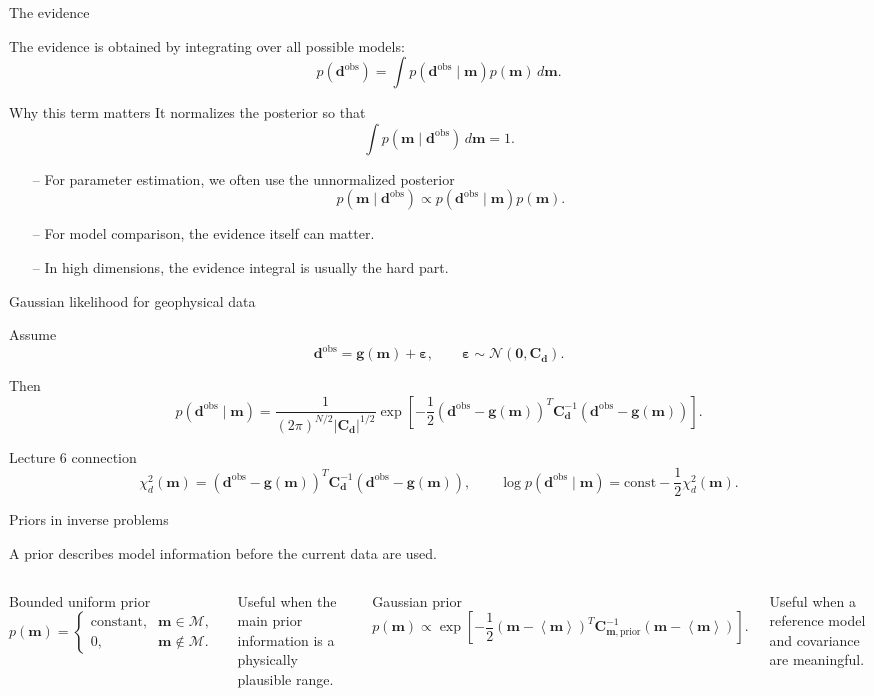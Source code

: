 \documentclass[aspectratio=169]{beamer}
\newcommand{\mat}[1]{{\mathbf{#1}}}
\renewcommand{\vec}[1]{\mathbf{#1}}
\newcommand{\dd}{ {\vec{d}} }
\newcommand{\dobs}{{\vec{d}^{\text{obs}}}}
\newcommand{\mm}{ {\vec{m}} }
\newcommand{\mmean}{\left\langle \mm \right\rangle}
\renewcommand{\gg}[1]{\vec{g}\left(#1\right)}
\newcommand{\Cd}{\mat{C}_{\dd}}
\newcommand{\Cm}{\mat{C}_{\mm,\text{prior}}}
\begin{document}
\begin{frame}{The evidence}
\small

The evidence is obtained by integrating over all possible models:
\[
p(\dobs)
=
\int p(\dobs\mid\mm)p(\mm)\,d\mm.
\]

\begin{alertblock}{Why this term matters}
It normalizes the posterior so that
\[
\int p(\mm\mid\dobs)\,d\mm = 1.
\]
\end{alertblock}

\begin{itemize}
    \item[--] For parameter estimation, we often use the unnormalized posterior
    \[
    p(\mm\mid\dobs)\propto p(\dobs\mid\mm)p(\mm).
    \]
    \item[--] For model comparison, the evidence itself can matter.
    \item[--] In high dimensions, the evidence integral is usually the hard part.
\end{itemize}
\end{frame}

\begin{frame}{Gaussian likelihood for geophysical data}
\small

Assume
\[
\dobs = \gg{\mm}+\boldsymbol\varepsilon,
\qquad
\boldsymbol\varepsilon\sim\mathcal{N}(\vec{0},\Cd).
\]

Then
\[
p(\dobs\mid\mm)
=
\frac{1}{(2\pi)^{N/2}|\Cd|^{1/2}}
\exp\left[
-\frac{1}{2}
\left(\dobs-\gg{\mm}\right)^T\Cd^{-1}
\left(\dobs-\gg{\mm}\right)
\right].
\]

\begin{alertblock}{Lecture 6 connection}
\[
\chi_d^2(\mm)
=
\left(\dobs-\gg{\mm}\right)^T\Cd^{-1}
\left(\dobs-\gg{\mm}\right),
\qquad
\log p(\dobs\mid\mm)=\text{const}-\frac{1}{2}\chi_d^2(\mm).
\]
\end{alertblock}
\end{frame}

\begin{frame}{Priors in inverse problems}
\small

A prior describes model information before the current data are used.

\begin{columns}[T]
\begin{block}{Bounded uniform prior}
\[
p(\mm)=
\begin{cases}
\text{constant}, & \mm\in\mathcal{M},\\
0, & \mm\notin\mathcal{M}.
\end{cases}
\]
\end{block}
Useful when the main prior information is a physically plausible range.

\begin{block}{Gaussian prior}
\[
p(\mm)
\propto
\exp\left[
-\frac{1}{2}
(\mm-\mmean)^T\Cm^{-1}(\mm-\mmean)
\right].
\]
\end{block}
Useful when a reference model and covariance are meaningful.
\end{columns}
\end{frame}
\end{document}
